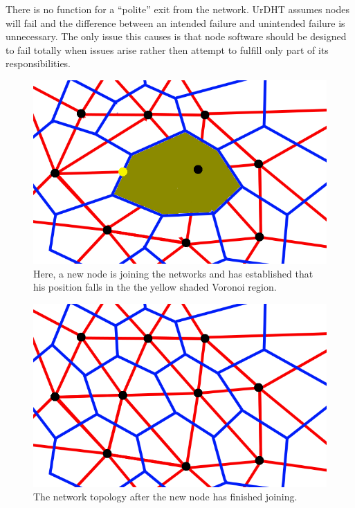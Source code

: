 \documentclass[11pt]{IEEEtran} %
\begin{document}
There is no function for a ``polite'' exit from the network. UrDHT assumes nodes will fail and the difference between an intended failure and unintended failure is unnecessary. The only issue this causes is that node software should be designed to fail totally when issues arise rather then attempt to fulfill only part of its responsibilities.  





\begin{figure}
    \includegraphics[width=\linewidth]{voronoi-churn4}
    \caption{Here, a new node is joining the networks and has established that his position falls in the the yellow shaded Voronoi region.}
    \label{fig:churnjoin}
\end{figure}


\begin{figure}
    \includegraphics[width=\linewidth]{voronoi-example}
    \caption{The network topology after the new node has finished joining.}
    \label{fig:churndone}
\end{figure}
\end{document}
